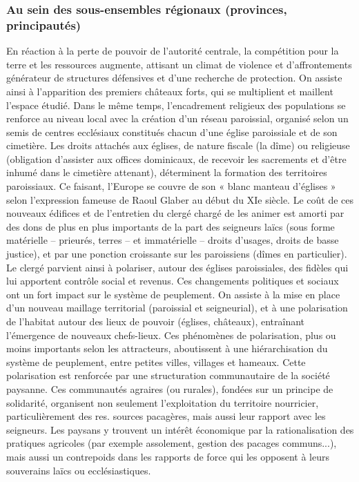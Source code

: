 \subsubsection{Au sein des sous-ensembles régionaux (provinces, principautés)}

En réaction à la perte de pouvoir de l'autorité centrale, la compétition pour la terre et les ressources augmente, attisant un climat de violence et d'affrontements générateur de structures défensives et d'une recherche de protection.
On assiste ainsi à l'apparition des premiers châteaux forts, qui se multiplient et maillent l'espace étudié.
Dans le même temps, l'encadrement religieux des populations se renforce au niveau local avec la création d'un réseau paroissial, organisé selon un semis de centres ecclésiaux constitués chacun d'une église paroissiale et de son cimetière.
Les droits attachés aux églises, de nature fiscale (la dîme) ou religieuse (obligation d'assister aux offices dominicaux, de recevoir les sacrements et d'être inhumé dans le cimetière attenant), déterminent la formation des territoires paroissiaux.
Ce faisant, l'Europe se couvre de son « blanc manteau d'églises » selon l'expression fameuse de Raoul Glaber au début du XIe siècle.
Le coût de ces nouveaux édifices et de l'entretien du clergé chargé de les animer est amorti par des dons de plus en plus importants de la part des seigneurs laïcs (sous forme matérielle – prieurés, terres – et immatérielle – droits d'usages, droits de basse justice), et par une ponction croissante sur les  paroissiens (dîmes en particulier).
Le clergé parvient ainsi à polariser, autour des églises paroissiales, des fidèles qui lui apportent contrôle social et revenus.
Ces changements politiques et sociaux ont un fort impact sur le système de peuplement.
On assiste à la mise en place d'un nouveau maillage territorial (paroissial et seigneurial), et à une polarisation de l'habitat autour des lieux de pouvoir (églises, châteaux), entraînant l'émergence de nouveaux chefs-lieux.
Ces phénomènes de polarisation, plus ou moins importants selon les attracteurs, aboutissent à une hiérarchisation du système de peuplement, entre petites villes, villages et hameaux.
Cette polarisation est renforcée par une structuration communautaire de la société paysanne.
Ces communautés agraires (ou rurales), fondées sur un principe de solidarité, organisent non seulement l'exploitation du territoire nourricier, particulièrement des res.
sources pacagères, mais aussi leur rapport avec les seigneurs.
Les paysans y trouvent un intérêt économique par la rationalisation des pratiques agricoles (par exemple assolement, gestion des pacages communs...), mais aussi un contrepoids dans les rapports de force qui les opposent à leurs souverains laïcs ou ecclésiastiques.

